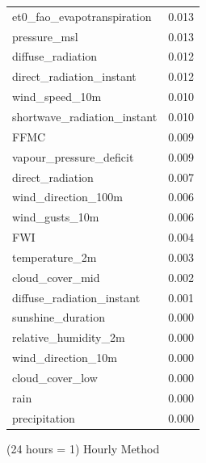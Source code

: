 \begin{table}[H]
\begin{tabular}{lc}
		et0\_fao\_evapotranspiration           & 0.013       \\ 
		pressure\_msl                           & 0.013       \\ 
		diffuse\_radiation                      & 0.012       \\ 
		direct\_radiation\_instant             & 0.012       \\ 
		wind\_speed\_10m                       & 0.010       \\ 
		shortwave\_radiation\_instant          & 0.010       \\ 
		FFMC                                    & 0.009       \\ 
		vapour\_pressure\_deficit               & 0.009       \\ 
		direct\_radiation                      & 0.007       \\ 
		wind\_direction\_100m                   & 0.006       \\ 
		wind\_gusts\_10m                        & 0.006       \\ 
		FWI                                     & 0.004       \\ 
		temperature\_2m                         & 0.003       \\ 
		cloud\_cover\_mid                       & 0.002       \\ 
		diffuse\_radiation\_instant            & 0.001       \\ 
		sunshine\_duration                      & 0.000       \\ 
		relative\_humidity\_2m                 & 0.000       \\ 
		wind\_direction\_10m                    & 0.000       \\ 
		cloud\_cover\_low                       & 0.000       \\ 
		rain                                    & 0.000       \\ 
		precipitation                           & 0.000       \\ 
	\end{tabular}
\end{table}

(24 hours = 1) Hourly Method

